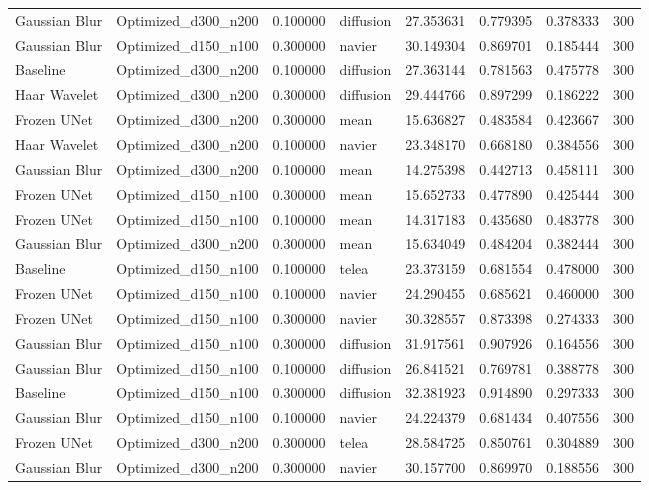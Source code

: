 \begin{table}[h]
\begin{tabular}{llrlrrrr}
Gaussian Blur & Optimized\_d300\_n200 & 0.100000 & diffusion & 27.353631 & 0.779395 & 0.378333 & 300 \\
Gaussian Blur & Optimized\_d150\_n100 & 0.300000 & navier & 30.149304 & 0.869701 & 0.185444 & 300 \\
Baseline & Optimized\_d300\_n200 & 0.100000 & diffusion & 27.363144 & 0.781563 & 0.475778 & 300 \\
Haar Wavelet & Optimized\_d300\_n200 & 0.300000 & diffusion & 29.444766 & 0.897299 & 0.186222 & 300 \\
Frozen UNet & Optimized\_d300\_n200 & 0.300000 & mean & 15.636827 & 0.483584 & 0.423667 & 300 \\
Haar Wavelet & Optimized\_d300\_n200 & 0.100000 & navier & 23.348170 & 0.668180 & 0.384556 & 300 \\
Gaussian Blur & Optimized\_d300\_n200 & 0.100000 & mean & 14.275398 & 0.442713 & 0.458111 & 300 \\
Frozen UNet & Optimized\_d150\_n100 & 0.300000 & mean & 15.652733 & 0.477890 & 0.425444 & 300 \\
Frozen UNet & Optimized\_d150\_n100 & 0.100000 & mean & 14.317183 & 0.435680 & 0.483778 & 300 \\
Gaussian Blur & Optimized\_d300\_n200 & 0.300000 & mean & 15.634049 & 0.484204 & 0.382444 & 300 \\
Baseline & Optimized\_d150\_n100 & 0.100000 & telea & 23.373159 & 0.681554 & 0.478000 & 300 \\
Frozen UNet & Optimized\_d150\_n100 & 0.100000 & navier & 24.290455 & 0.685621 & 0.460000 & 300 \\
Frozen UNet & Optimized\_d150\_n100 & 0.300000 & navier & 30.328557 & 0.873398 & 0.274333 & 300 \\
Gaussian Blur & Optimized\_d150\_n100 & 0.300000 & diffusion & 31.917561 & 0.907926 & 0.164556 & 300 \\
Gaussian Blur & Optimized\_d150\_n100 & 0.100000 & diffusion & 26.841521 & 0.769781 & 0.388778 & 300 \\
Baseline & Optimized\_d150\_n100 & 0.300000 & diffusion & 32.381923 & 0.914890 & 0.297333 & 300 \\
Gaussian Blur & Optimized\_d150\_n100 & 0.100000 & navier & 24.224379 & 0.681434 & 0.407556 & 300 \\
Frozen UNet & Optimized\_d300\_n200 & 0.300000 & telea & 28.584725 & 0.850761 & 0.304889 & 300 \\
Gaussian Blur & Optimized\_d300\_n200 & 0.300000 & navier & 30.157700 & 0.869970 & 0.188556 & 300 \\

\end{tabular}
\end{table}
